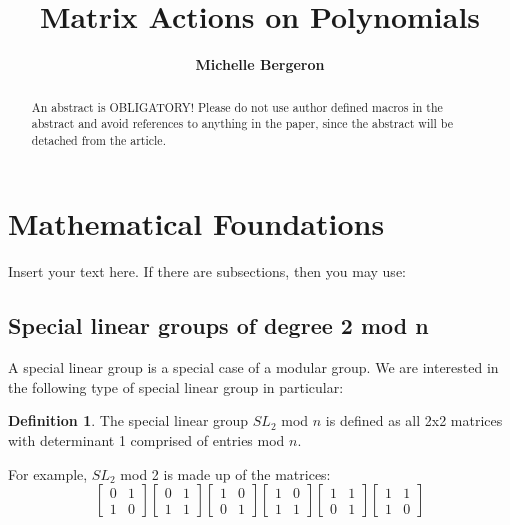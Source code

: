 \documentclass[a4paper,draft]{amsproc}
\title[Running title (header)]{Matrix Actions on Polynomials}
\author[Surname]{\bfseries Michelle Bergeron}
\theoremstyle{plain}
\theoremstyle{definition}
\newtheorem{dfn}{Definition}[section]
\theoremstyle{remark}
\numberwithin{equation}{section}
\begin{document}
\vspace{18mm} \setcounter{page}{1} \thispagestyle{empty}


\begin{abstract}
An abstract is OBLIGATORY!
Please do not use author defined macros in the abstract
and avoid references to anything in the paper,
since the abstract will be detached from the article.
\end{abstract}

\maketitle

\section{Mathematical Foundations} 

Insert your text here. If there are subsections, then you may use:

\subsection{Special linear groups of degree 2 mod n}
A special linear group is a special case of a modular group. We are interested in the following type of special linear group in particular: 
\begin{dfn}
The special linear group $SL_{2}$ mod $n$ is defined as all 2x2 matrices with determinant 1 comprised of entries mod $n$.
\end{dfn}

For example, $SL_{2}$ mod 2 is made up of the matrices:
$$
\begin{bmatrix}
 0&1 \\ 
 1&0 
\end{bmatrix}
\begin{bmatrix}
 0&1 \\ 
 1&1 
\end{bmatrix}
\begin{bmatrix}
 1&0 \\ 
 0&1 
\end{bmatrix}
\begin{bmatrix}
 1&0 \\ 
 1&1 
\end{bmatrix}
\begin{bmatrix}
 1&1 \\ 
 0&1 
\end{bmatrix}
\begin{bmatrix}
 1&1 \\ 
 1&0 
\end{bmatrix}
$$
\end{document}
